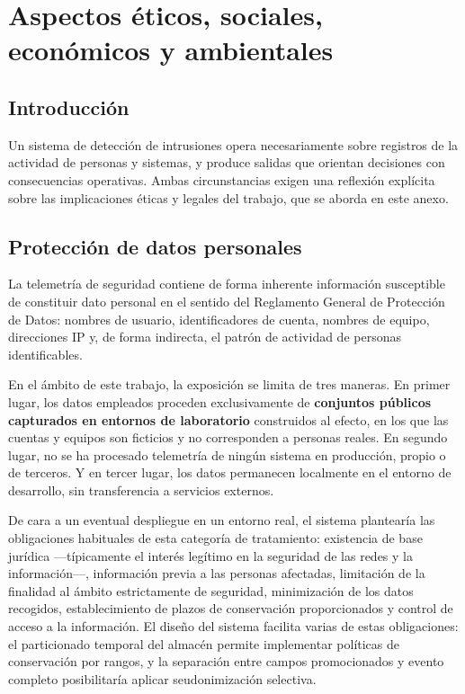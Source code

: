 \chapter{Aspectos éticos, sociales, económicos y ambientales}
\label{cap:aspectos}

\section{Introducción}

Un sistema de detección de intrusiones opera necesariamente sobre registros de la actividad
de personas y sistemas, y produce salidas que orientan decisiones con consecuencias
operativas. Ambas circunstancias exigen una reflexión explícita sobre las implicaciones
éticas y legales del trabajo, que se aborda en este anexo.

\section{Protección de datos personales}

La telemetría de seguridad contiene de forma inherente información susceptible de constituir
dato personal en el sentido del Reglamento General de Protección de Datos: nombres de
usuario, identificadores de cuenta, nombres de equipo, direcciones IP y, de forma indirecta,
el patrón de actividad de personas identificables.

En el ámbito de este trabajo, la exposición se limita de tres maneras. En primer lugar, los
datos empleados proceden exclusivamente de \textbf{conjuntos públicos capturados en entornos
de laboratorio} construidos al efecto, en los que las cuentas y equipos son ficticios y no
corresponden a personas reales. En segundo lugar, no se ha procesado telemetría de ningún
sistema en producción, propio o de terceros. Y en tercer lugar, los datos permanecen
localmente en el entorno de desarrollo, sin transferencia a servicios externos.

De cara a un eventual despliegue en un entorno real, el sistema plantearía las obligaciones
habituales de esta categoría de tratamiento: existencia de base jurídica —típicamente el
interés legítimo en la seguridad de las redes y la información—, información previa a las
personas afectadas, limitación de la finalidad al ámbito estrictamente de seguridad,
minimización de los datos recogidos, establecimiento de plazos de conservación proporcionados
y control de acceso a la información. El diseño del sistema facilita varias de estas
obligaciones: el particionado temporal del almacén permite implementar políticas de
conservación por rangos, y la separación entre campos promocionados y evento completo
posibilitaría aplicar seudonimización selectiva.


